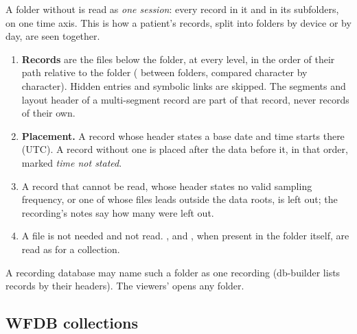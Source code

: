 A folder without  is read as \emph{one session}: every record in it and in its
subfolders, on one time axis. This is how a patient's records, split into folders by device or by
day, are seen together.
\begin{enumerate}
\item \textbf{Records} are the  files below the folder, at every level, in the order
  of their path relative to the folder (\code{/} between folders, compared character by
  character). Hidden entries and symbolic links are skipped. The segments and layout header of a
  multi-segment record are part of that record, never records of their own.
\item \textbf{Placement.} A record whose header states a base date and time starts there (UTC).
  A record without one is placed after the data before it, in that order, marked \emph{time not
  stated}.
\item A record that cannot be read, whose header states no valid sampling frequency, or one of
  whose files leads outside the data roots, is left out; the recording's notes say how many were
  left out.
\item A  file is not needed and not read. ,  and
  , when present in the folder itself, are read as for a collection.
\end{enumerate}
A recording database may name such a folder as one recording (db-builder lists records by their
headers). The viewers'  opens any folder.


\subsection{WFDB collections}
\label{sec:recordings-collection}

